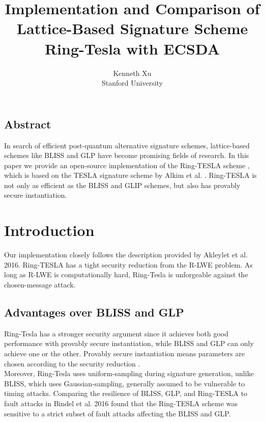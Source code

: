 \documentclass[letterpaper,twocolumn,10pt]{article}
\begin{document}
\date{}

\title{\Large \bf Implementation and Comparison of Lattice-Based Signature Scheme Ring-Tesla with ECSDA}

\author{
{\rm Kenneth Xu }\\
  Stanford University
}

\maketitle

\thispagestyle{empty}


\subsection*{Abstract}
In search of efficient post-quantum alternative signature schemes, lattice-based schemes like BLISS and GLP have become promising fields of research. In this paper we provide an open-source implementation of the Ring-TESLA scheme \cite{rTesla}, which is based on the TESLA signature scheme by Alkim et al. \cite{Tesla}. Ring-TESLA is not only as efficient as the BLISS and GLIP schemes, but also has provably secure instantiation.

\section{Introduction}
Our implementation closely follows the description provided by Akleylet et al. 2016. Ring-TESLA has a tight security reduction from the R-LWE problem. As long as R-LWE is computationally hard, Ring-Tesla is unforgeable against the chosen-message attack. \cite{rTesla}

\subsection{Advantages over BLISS and GLP}
Ring-Tesla has a stronger security argument since it achieves both good performance with provably secure instantiation, while BLISS and GLP can only achieve one or the other. Provably secure instantiation means parameters are chosen according to the security reduction \cite{rTesla}. \\
Moreover, Ring-Tesla uses uniform-sampling during signature generation, unlike BLISS, which uses Gaussian-sampling, generally assumed to be vulnerable to timing attacks. Comparing the resilience of BLISS, GLP, and Ring-TESLA to fault attacks in Bindel et al. 2016 \cite{faultAttacks} found that the Ring-TESLA scheme was sensitive to a strict subset of fault attacks affecting the BLISS and GLP.
\end{document}
